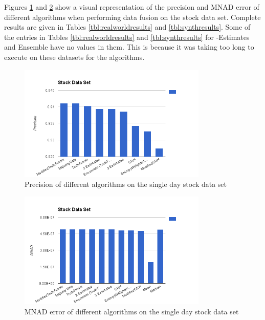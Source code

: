\documentclass{acm_proc_article-sp}
\begin{document}
Figures \ref{fig:precision} and \ref{fig:mnad} show a visual representation of the precision and MNAD error of different algorithms when performing data fusion on the stock data set. Complete results are given in Tables \ref{tbl:realworldresults} and \ref{tbl:synthresults}. Some of the entries in Tables \ref{tbl:realworldresults} and \ref{tbl:synthresults} for {-Estimates} and {\sc Ensemble} have no values in them. This is because it was taking too long to execute on these datasets for the algorithms. 



\begin{figure}
\centering
\includegraphics[width=9cm]{StockPrecision.png}
\caption{Precision of different algorithms on the single day stock data set}
\label{fig:precision}
\end{figure}


\begin{figure}
\centering
\includegraphics[width=9cm]{StockMNAD.png}
\caption{MNAD error of different algorithms on the single day stock data set}
\label{fig:mnad}
\end{figure}
\end{document}
